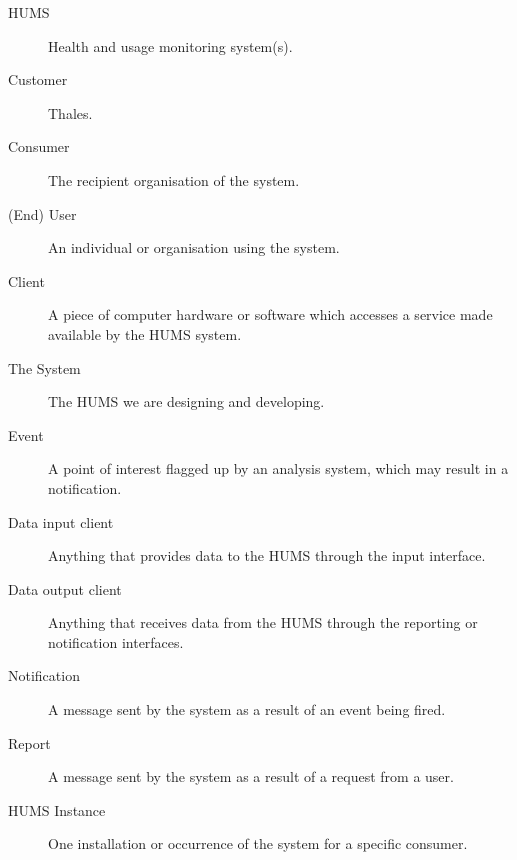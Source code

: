 \documentclass[10pt,a4paper]{article}
\begin{document}
\begin{description}

	\item[HUMS] Health and usage monitoring system(s).
	\item[Customer] Thales. 
	\item[Consumer] The recipient organisation of the system.
	\item[(End) User] An individual or organisation using the system.
	\item[Client] A piece of computer hardware or software which accesses a
	              service made available by the HUMS system.
	\item[The System] The HUMS we are designing and developing.
	\item[Event] A point of interest flagged up by an analysis system, which
	             may result in a notification.
	\item[Data input client] Anything that provides data to the HUMS through
	                         the input interface.
	\item[Data output client] Anything that receives data from the HUMS
	                          through the reporting or notification interfaces.
	\item[Notification] A message sent by the system as a result of an event
	                    being fired.
	\item[Report] A message sent by the system as a result of a request from a
	              user. 
	\item[HUMS Instance] One installation or occurrence of the system for a
	                     specific consumer.
\end{description}
\pagebreak


\end{document}
